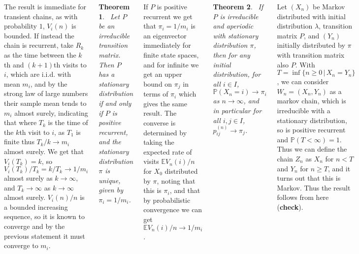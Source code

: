 \documentclass{tikzposter} %
\newtheorem{theorem}{Theorem}
\begin{document}
\begin{columns}
{  The result is immediate for transient chains, as with probability $1$, $V_{i}(n)$ is bounded. If instead the chain is recurrent, take $R_{k}$ as the time between the $k$th and $(k+1)$th visits to $i$, which are i.i.d. with mean $m_{i}$, and by the strong law of large numbers their sample mean tends to $m_{i}$ almost surely, indicating that where $T_{k}$ is the time of the $k$th visit to $i$, as $T_{1}$ is finite thus $T_{k} / k \to m_{i}$ almost surely. We get that $V_{i}(T_{k}) = k$, so $V_{i}(T_{k})/T_{k} = k / T_{k} \to 1/m_{i}$ almost surely as $k \to \infty$, and $T_{k} \to \infty$ as $k \to \infty$ almost surely. $V_{i}(n)/n$ is a bounded increasing sequence, so it is known to converge and by the previous statement it must converge to $m_{i}$. \\

  \begin{theorem}
  \ Let $P$ be an irreducible transition matrix. Then $P$ has a stationary distribution if and only if $P$ is positive recurrent, and the stationary distribution $\pi$ is unique, given by $\pi_{i} = 1/m_{i}$.
  \end{theorem}
  \hphantom{}

  If $P$ is positive recurrent we get that $\pi_{i} = 1/m_{i}$ is an eigenvector immediately for finite state spaces, and for infinite we get an upper bound on $\pi_{j}$ in terms of $\pi_{i}$ which gives the same result. The converse is determined by taking the expected rate of visits $\mathbb{E} V_{n}(i)/n$ for $X_{0}$ distributed by $\pi$, noting that this is $\pi_{i}$, and that by probabilistic convergence we can get $\mathbb{E}V_{n}(i)/n \to 1/m_{i}$. \\

  \begin{theorem}
  \ If $P$ is irreducible and aperiodic with stationary distribution $\pi$, then for any initial distribution, for all $i \in I$, $\mathbb{P}(X_{n} = i) \to \pi_{i}$ as $n \to \infty$, and in particular for all $i, j \in I$, $p_{ij}^{(n)} \to \pi_{j}$.
  \end{theorem}
  \hphantom{}

  Let $(X_{n})$ be Markov distributed with initial distribution $\lambda$, transition matrix $P$, and $(Y_{n})$ initially distributed by $\pi$ with transition matrix also $P$. With $T = \inf \{ n \ge 0 \,|\, X_{n} = Y_{n}\}$, we can consider $W_{n} = (X_{n}, Y_{n})$ as a markov chain, which is irreducible with a stationary distribution, so is positive recurrent and $\mathbb{P}(T < \infty) = 1$. Thus we can define the chain $Z_{n}$ as $X_{n}$ for $n < T$ and $Y_{n}$ for $n \ge T$, and it turns out that this is Markov. Thus the result follows from here (\textbf{check}). \\

}
\end{columns}
\end{document}
